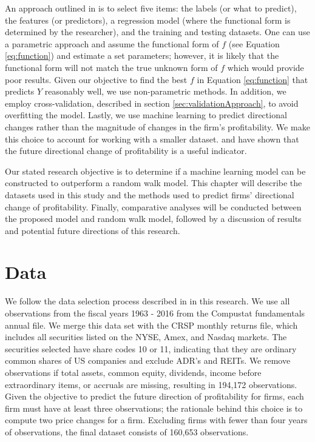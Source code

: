 An approach outlined in \cite{Monahan} is to select five items: the labels (or what to predict), the features (or predictors), a regression model (where the functional form is determined by the researcher),  and the training and testing datasets.  One can use a parametric approach and assume the functional form of \(f\) (see Equation \ref{eq:function}) and estimate a set parameters; however,  it is likely that the functional form will not match the true unknown form of \(f\) which would provide poor results.  Given our objective to find the best \(f\) in Equation \ref{eq:function} that predicts \(Y\) reasonably well, we use non-parametric methods.  In addition, we employ cross-validation, described in section \ref{sec:validationApproach}, to avoid overfitting the model.  Lastly, we use machine learning to predict directional changes rather than the magnitude of changes in the firm's profitability. We make this choice to account for working with a smaller dataset.  \cite{BB68} and \cite{OU1989295} have shown that the future directional change of profitability is a useful indicator. 

Our stated research objective is to determine if a machine learning model can be constructed to outperform a random walk model.  This chapter will describe the datasets used in this study and the methods used to predict firms' directional change of profitability.  Finally, comparative analyses will be conducted between the proposed model and random walk model, followed by a discussion of results and potential future directions of this research.

\section{Data} \label{sec:ABIS:Data}

We follow the data selection process described in \cite{HOU2012504} in this research. We use all observations from the fiscal years 1963 - 2016 from the Compustat fundamentals annual file. We merge this data set with the CRSP monthly returns file, which includes all securities listed on the NYSE,  Amex,  and Nasdaq markets. The securities selected have share codes 10 or 11, indicating that they are ordinary common shares of US companies and exclude ADR's and REITs. We remove observations if total assets, common equity, dividends, income before extraordinary items,  or accruals are missing, resulting in 194,172 observations.  Given the objective to predict the future direction of profitability for firms, each firm must have at least three observations; the rationale behind this choice is to compute two price changes for a firm. Excluding firms with fewer than four years of observations, the final dataset consists of 160,653 observations.  

